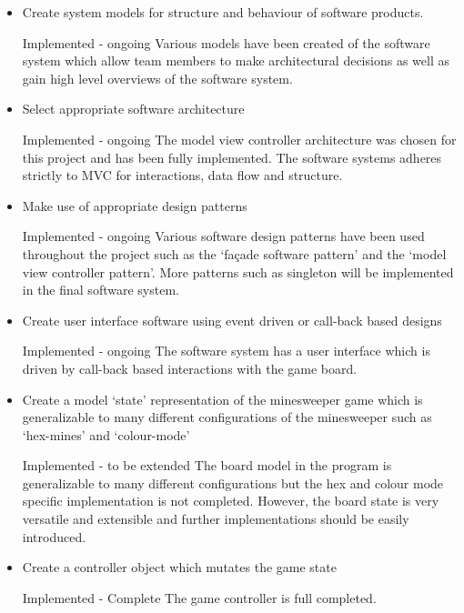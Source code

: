 \documentclass[12pt, a4]{report}
\begin{document}
\begin{itemize}
	\item Create system models for structure and behaviour of software products.
	\par \textcolor{codegreen}{Implemented - ongoing \textbar{} } Various models have been created of the software system which allow team members to make architectural decisions as well as gain high level overviews of the software system.
	
	\item Select appropriate software architecture
	\par \textcolor{codegreen}{Implemented - ongoing \textbar{} } The model view controller architecture was chosen for this project and has been fully implemented. The software systems adheres strictly to MVC for interactions, data flow and structure. 

	\item Make use of appropriate design patterns
	\par \textcolor{codegreen}{Implemented - ongoing \textbar{} } Various software design patterns have been used throughout the project such as the `façade software pattern' and the `model view controller pattern'. More patterns such as singleton will be implemented in the final software system.

	\item Create user interface software using event driven or call-back based designs
	\par \textcolor{codegreen}{Implemented - ongoing \textbar{} } The software system has a user interface which is driven by call-back based interactions with the game board.

	\item Create a model `state' representation of the minesweeper game which is generalizable to many different configurations of the minesweeper such as `hex-mines' and `colour-mode'
	\par \textcolor{fawn}{Implemented - to be extended \textbar{} } The board model in the program is generalizable to many different configurations but the hex and colour mode specific implementation is not completed. However, the board state is very versatile and extensible and further implementations should be easily introduced.

	\item Create a controller object which mutates the game state
	\par \textcolor{codegreen}{Implemented - Complete \textbar{} } The game controller is full completed.


\end{itemize}
\end{document}
